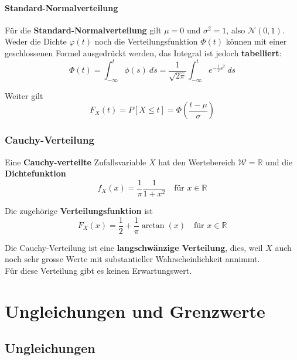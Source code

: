 \documentclass[11pt]{article}
\begin{document}
\paragraph{Standard-Normalverteilung}

F{\"u}r die \textbf{Standard-Normalverteilung} gilt $\mu = 0$ und $\sigma^2 = 1$, also $\mathcal{N}(0,1)$. Weder die Dichte $\varphi(t)$ noch die Verteilungsfunktion $\Phi(t)$ k{\"o}nnen mit einer geschlossenen Formel ausgedr{\"u}ckt werden, das Integral ist jedoch \textbf{tabelliert}:
\begin{equation*}
	\Phi(t) = \int_{-\infty}^t \phi(s)\ ds = \frac{1}{\sqrt{2\pi}}\int_{-\infty}^t e^{-\frac{1}{2}s^2}\ ds
\end{equation*}

Weiter gilt
\begin{equation*}
	F_X(t) = P[X \leq t] = \Phi(\frac{t-\mu}{\sigma})
\end{equation*}

\subsubsection{Cauchy-Verteilung}

Eine \textbf{Cauchy-verteilte} Zufallsvariable $X$ hat den Wertebereich $\mathcal{W} = \mathbb{R}$ und die \textbf{Dichtefunktion}
\begin{equation*}
	f_X(x) = \frac{1}{\pi}\frac{1}{1+x^2}\quad\text{f{\"u}r }x \in \mathbb{R}
\end{equation*}

Die zugeh{\"o}rige \textbf{Verteilungsfunktion} ist 
\begin{equation*}
	F_X(x) = \frac{1}{2}+\frac{1}{\pi}\arctan(x)\quad\text{f{\"u}r }x \in \mathbb{R}
\end{equation*}

Die Cauchy-Verteilung ist eine \textbf{langschw{\"a}nzige Verteilung}, dies, weil $X$ auch noch sehr grosse Werte mit substantieller Wahrscheinlichkeit annimmt. \\
F{\"u}r diese Verteilung gibt es keinen Erwartungswert.

\section{Ungleichungen und Grenzwerte}

\subsection{Ungleichungen}
\end{document}
